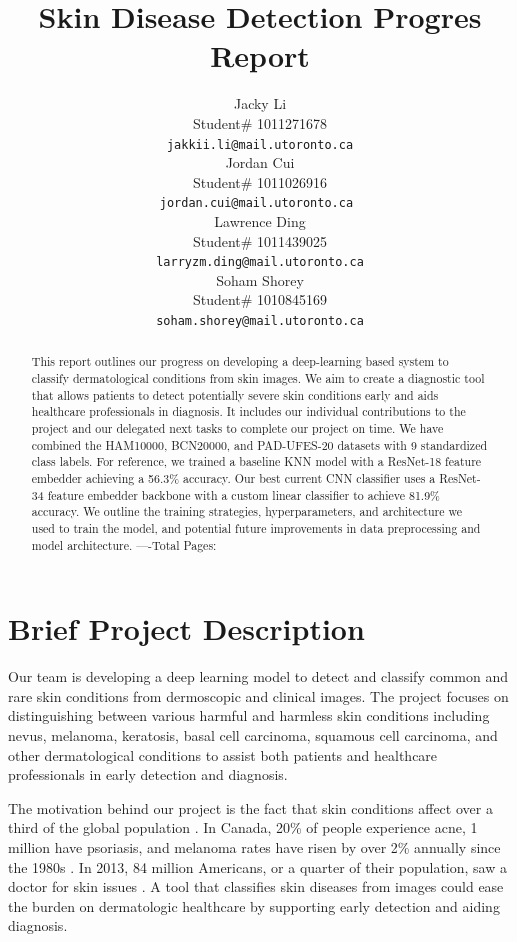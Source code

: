 \documentclass{article} %
\title{Skin Disease Detection Progres Report}
\author{Jacky Li  \\
Student\# 1011271678\\
\texttt{jakkii.li@mail.utoronto.ca} \\
\And
Jordan Cui  \\
Student\# 1011026916 \\
\texttt{jordan.cui@mail.utoronto.ca \phantom{    }} \\
\AND
Lawrence Ding  \\
Student\# 1011439025 \\
\texttt{larryzm.ding@mail.utoronto.ca} \\
\And
Soham Shorey \\
Student\# 1010845169 \\
\texttt{soham.shorey@mail.utoronto.ca} \\
\AND
}
\begin{document}
\maketitle

\vspace{-1cm}

\begin{abstract}
This report outlines our progress on developing a deep-learning based system to classify dermatological conditions from skin images. We aim to create a diagnostic tool that allows patients to detect potentially severe skin conditions early and aids healthcare professionals in diagnosis. It includes our individual contributions to the project and our delegated next tasks to complete our project on time. We have combined the HAM10000, BCN20000, and PAD-UFES-20 datasets with 9 standardized class labels. For reference, we trained a baseline KNN model with a ResNet-18 feature embedder achieving a 56.3\% accuracy. Our best current CNN classifier uses a ResNet-34 feature embedder backbone with a custom linear classifier to achieve 81.9\% accuracy. We outline the training strategies, hyperparameters, and architecture we used to train the model, and potential future improvements in data preprocessing and model architecture.
----Total Pages: \pageref{last_page}
\end{abstract}

\section{Brief Project Description}

Our team is developing a deep learning model to detect and classify common and rare skin conditions from dermoscopic and clinical images. The project focuses on distinguishing between various harmful and harmless skin conditions including nevus, melanoma, keratosis, basal cell carcinoma, squamous cell carcinoma, and other dermatological conditions to assist both patients and healthcare professionals in early detection and diagnosis.

The motivation behind our project is the fact that skin conditions affect over a third of the global population \citep{li2024epidemiological}. In Canada, 20\% of people experience acne, 1 million have psoriasis, and melanoma rates have risen by over 2\% annually since the 1980s \citep{canadian_dermatology_association}. In 2013, 84 million Americans, or a quarter of their population, saw a doctor for skin issues \citep{american_academy_dermatology}. A tool that classifies skin diseases from images could ease the burden on dermatologic healthcare by supporting early detection and aiding diagnosis.
\end{document}
